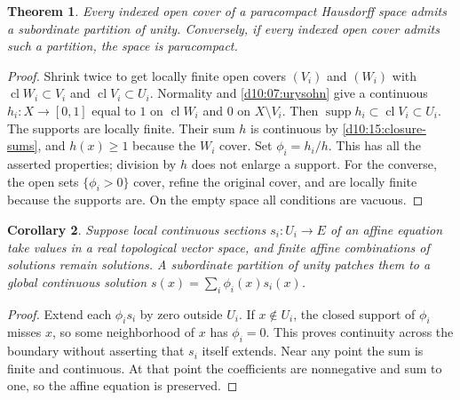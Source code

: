 \documentclass[11pt,oneside,openany]{book}
\newtheorem{theorem}{Theorem}[chapter]
\newtheorem{corollary}[theorem]{Corollary}
\theoremstyle{definition}
\theoremstyle{remark}
\DeclareMathOperator{\cl}{cl}
\DeclareMathOperator{\supp}{supp}
\begin{document}
\begin{theorem}\label{d10:15:partition}
Every indexed open cover of a paracompact Hausdorff space admits a
subordinate partition of unity. Conversely, if every indexed open cover
admits such a partition, the space is paracompact.
\end{theorem}
\begin{proof}
Shrink twice to get locally finite open covers $(V_i)$ and $(W_i)$ with
$\cl W_i\subset V_i$ and $\cl V_i\subset U_i$.
Normality and \cref{d10:07:urysohn} give a continuous $h_i:X\to[0,1]$
equal to $1$ on $\cl W_i$ and $0$ on $X\setminus V_i$.
Then $\supp h_i\subset\cl V_i\subset U_i$. The supports are locally finite.
Their sum $h$ is continuous by \cref{d10:15:closure-sums}, and $h(x)\geq1$
because the $W_i$ cover. Set $\phi_i=h_i/h$. This has all the asserted
properties; division by $h$ does not enlarge a support.
For the converse, the open sets $\{\phi_i>0\}$ cover, refine the original
cover, and are locally finite because the supports are. On the empty space
all conditions are vacuous.
\end{proof}

\begin{corollary}\label{d10:15:patching}
Suppose local continuous sections $s_i:U_i\to E$ of an affine equation
take values in a real topological vector space, and finite affine
combinations of solutions remain solutions. A subordinate partition of
unity patches them to a global continuous solution
$s(x)=\sum_i\phi_i(x)s_i(x)$.
\end{corollary}
\begin{proof}
Extend each $\phi_i s_i$ by zero outside $U_i$.
If $x\notin U_i$, the closed support of $\phi_i$ misses $x$, so some
neighborhood of $x$ has $\phi_i=0$. This proves continuity across the
boundary without asserting that $s_i$ itself extends. Near any point the
sum is finite and continuous. At that point the coefficients are
nonnegative and sum to one, so the affine equation is preserved.
\end{proof}
\end{document}
